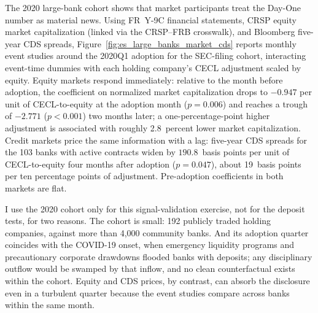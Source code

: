 The 2020 large-bank cohort shows that market participants treat the
Day-One number as material news.  Using FR~Y-9C financial statements,
CRSP equity market capitalization (linked via the CRSP--FRB crosswalk),
and Bloomberg five-year CDS spreads,
Figure~\ref{fig:es_large_banks_market_cds} reports monthly event
studies around the 2020Q1 adoption for the SEC-filing cohort,
interacting event-time dummies with each holding company's CECL
adjustment scaled by equity.  Equity markets respond immediately:
relative to the month before adoption, the coefficient on normalized
market capitalization drops to $-0.947$ per unit of CECL-to-equity at
the adoption month ($p = 0.006$) and reaches a trough of $-2.771$
($p < 0.001$) two months later; a one-percentage-point higher
adjustment is associated with roughly 2.8~percent lower market
capitalization.  Credit markets price the same information with a lag:
five-year CDS spreads for the 103 banks with active contracts widen by
$190.8$~basis points per unit of CECL-to-equity four months after
adoption ($p = 0.047$), about 19~basis points per ten percentage
points of adjustment.  Pre-adoption coefficients in both markets are
flat.

I use the 2020 cohort only for this signal-validation exercise, not
for the deposit tests, for two reasons.  The cohort is small: 192
publicly traded holding companies, against more than 4,000
community banks.  And its adoption quarter coincides with the COVID-19
onset, when emergency liquidity programs and precautionary corporate
drawdowns flooded banks with deposits; any disciplinary outflow would
be swamped by that inflow, and no clean counterfactual exists within
the cohort.  Equity and CDS prices, by contrast, can absorb the
disclosure even in a turbulent quarter because the event studies
compare across banks within the same month.
